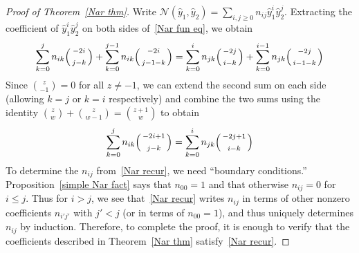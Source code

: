 \documentclass[ALCO,ThmDefs,Unicode,epreuves]{cedram}
\newcommand{\N}{{\mathcal N}}
\newcommand{\hy}{\hat{y}}
\begin{document}
\begin{proof}[Proof of Theorem~\ref{Nar thm}]
Write $\N(\hy_1,\hy_2)=\sum_{i,j\ge0}n_{ij}\hy_1^i\hy_2^j$.
Extracting the coefficient of $\hy_1^i\hy_2^j$ on both sides of~\eqref{Nar fun eq}, we obtain
\begin{equation}\label{Nar recur prelim}
\sum_{k=0}^jn_{ik}\begin{psmallmatrix}-2i\\\\j-k\end{psmallmatrix}+\sum_{k=0}^{j-1}n_{ik}\begin{psmallmatrix}{-2i}\\\\{j-1-k}\end{psmallmatrix}
=\sum_{k=0}^in_{jk}\begin{psmallmatrix}-2j\\\\i-k\end{psmallmatrix}+\sum_{k=0}^{i-1}n_{jk}\begin{psmallmatrix}-2j\\\\i-1-k\end{psmallmatrix}
\end{equation}
Since $\binom{z}{-1}=0$ for all $z\neq-1$, we can extend the second sum on each side (allowing $k=j$ or $k=i$ respectively) and combine the two sums using the identity $\binom{z}{w}+\binom{z}{w-1}=\binom{z+1}{w}$ to obtain
\begin{equation}\label{Nar recur}
\sum_{k=0}^jn_{ik}\begin{psmallmatrix}-2i+1\\\\j-k\end{psmallmatrix}
=\sum_{k=0}^in_{jk}\begin{psmallmatrix}-2j+1\\\\i-k\end{psmallmatrix}
\end{equation}
To determine the $n_{ij}$ from~\eqref{Nar recur}, we need ``boundary conditions.''
Proposition~\ref{simple Nar fact} says that $n_{00}=1$ and that otherwise $n_{ij}=0$ for $i\le j$.
Thus for $i>j$, we see that~\eqref{Nar recur} writes $n_{ij}$ in terms of other nonzero coefficients $n_{i'j'}$ with $j'<j$ (or in terms of $n_{00}=1$), and thus uniquely determines $n_{ij}$ by induction.
Therefore, to complete the proof, it is enough to verify that the coefficients described in Theorem~\ref{Nar thm} satisfy~\eqref{Nar recur}.


\end{proof}
\end{document}
